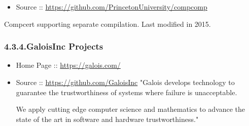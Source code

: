 \documentclass[12pt,twoside]{article}
\begin{document}
\begin{itemize}[noitemsep,topsep=\mdcompacttopsep]%

\item{}Source :: \href{https://github.com/PrincetonUniversity/compcomp}{{\ttfamily https://\hspace{0pt}github.\hspace{0pt}com/\hspace{0pt}PrincetonUniversity/\hspace{0pt}compcomp}}%
\end{itemize}%

\noindent{}Compcert supporting separate compilation. Last modified in 2015.%

\subsubsection{4.3.4.\hspace*{0.5em}GaloisInc Projects}\label{sec-galoisinc-projects}%

\begin{itemize}%

\item{}
Home Page :: \href{https://galois.com/}{{\ttfamily https://\hspace{0pt}galois.\hspace{0pt}com/\hspace{0pt}}}%

\item{}
Source :: \href{https://github.com/GaloisInc}{{\ttfamily https://\hspace{0pt}github.\hspace{0pt}com/\hspace{0pt}GaloisInc}}
  "Galois develops technology to guarantee the trustworthiness of
  systems where failure is unacceptable.%

  We apply cutting edge computer science and mathematics to advance the
  state of the art in software and hardware trustworthiness."%
\end{itemize}%
\end{document}
